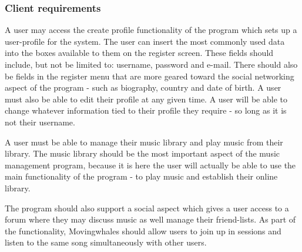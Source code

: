 \subsubsection{Client requirements}


A user may access the create profile functionality of the program which sets up a user-profile for the system. The user can insert the most commonly used data into the boxes available to them on the register screen. These fields should include, but not be limited to: username, password and e-mail. There should also be fields in the register menu that are more geared toward the social networking aspect of the program - such as biography, country and date of birth. 
A user must also be able to edit their profile at any given time. A user will be able to change whatever information tied to their profile they require - so long as it is not their username. 


A user must be able to manage their music library and play music from their library. The music library should be the most important aspect of the music management program, because it is here the user will actually be able to use the main functionality of the program - to play music and establish their online library.


The program should also support a social aspect which gives a user access to a forum where they may discuss music as well manage their friend-lists. As part of the functionality, Movingwhales should allow users to join up in sessions and listen to the same song simultaneously with other users.